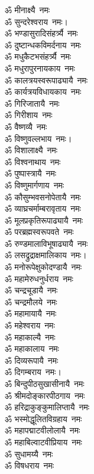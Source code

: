 \begin{multicols}{2}
\begin{flushleft}
ॐ मीनाक्ष्यै~नमः\\
ॐ सुन्दरेश्वराय~नमः।\hfill{}\\
ॐ भण्डासुरादिसंहर्त्र्यै~नमः\\
ॐ दुष्टान्धकविमर्दनाय~नमः\\
ॐ मधुकैटभसंहर्त्र्यै~नमः\\
ॐ मधुरापुरनायकाय~नमः\\
ॐ कालत्रयस्वरूपाढ्यायै~नमः\\
ॐ कार्यत्रयविधायकाय~नमः\\
ॐ गिरिजातायै~नमः\\
ॐ गिरीशाय~नमः\\
ॐ वैष्णव्यै~नमः\\
ॐ विष्णुवल्लभाय~नमः।\hfill{}\\
ॐ विशालाक्ष्यै~नमः\\
ॐ विश्वनाथाय~नमः\\
ॐ पुष्पास्त्रायै~नमः\\
ॐ विष्णुमार्गणाय~नमः\\
ॐ कौसुम्भवसनोपेतायै~नमः\\
ॐ व्याघ्रचर्माम्बरावृताय~नमः\\
ॐ मूलप्रकृतिरूपाढ्यायै~नमः\\
ॐ परब्रह्मस्वरूपवते~नमः\\
ॐ रुण्डमालाविभूषाढ्यायै~नमः\\
ॐ लसद्रुद्राक्षमालिकाय~नमः।\hfill{}\\
ॐ मनोरूपेक्षुकोदण्डायै~नमः\\
ॐ महामेरुधनुर्धराय~नमः\\
ॐ चन्द्रचूडायै~नमः\\
ॐ चन्द्रमौलये~नमः\\
ॐ महामायायै~नमः\\
ॐ महेश्वराय~नमः\\
ॐ महाकाल्यै~नमः\\
ॐ महाकालाय~नमः\\
ॐ दिव्यरूपायै~नमः\\
ॐ दिगम्बराय~नमः।\hfill{}\\
ॐ बिन्दुपीठसुखासीनायै~नमः\\
ॐ श्रीमदोङ्कारपीठगाय~नमः\\
ॐ हरिद्राकुङ्कुमालिप्तायै~नमः\\
ॐ भस्मोद्धूलितविग्रहाय~नमः\\
ॐ महापद्माटवीलोलायै~नमः\\
ॐ महाबिल्वाटवीप्रियाय~नमः\\
ॐ सुधामय्यै~नमः\\
ॐ विषधराय~नमः\\

\end{flushleft}
\end{multicols}
